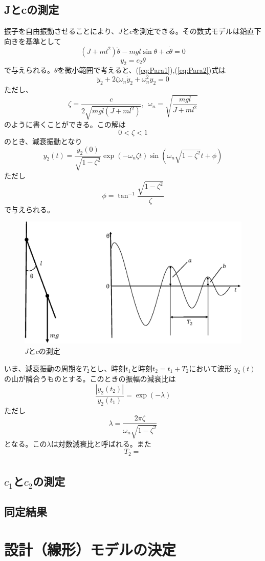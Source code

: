\subsection{Jとcの測定}
	振子を自由振動させることにより、$J$と$c$を測定できる。その数式モデルは鉛直下向きを基準として
	\begin{equation}
		(J + ml^{2})\ddot{\theta} - mgl\sin{\theta} + c\dot{\theta} = 0
		\label{eq:Para1}
	\end{equation}
	\begin{equation}
		y_{2} = c_{2}\theta
	\label{eq:Para2}
	\end{equation}
	で与えられる。$\theta$を微小範囲で考えると、(\ref{eq:Para1}),(\ref{eq:Para2})式は
	\begin{equation}
		\ddot{y}_{2} + 2\zeta\omega_{n}\dot{y}_{2} + \omega_{n}^{2}y_{2} = 0
	\end{equation}
	ただし、
	\begin{equation}
		\zeta = \frac{c}{2\sqrt{mgl\left(J + ml^{2}\right)}} 
		,\ \  \omega_{n} = \sqrt{\frac{mgl}{J+ml^{2}}}
	\end{equation}
	のように書くことができる。この解は
	\[0<\zeta<1\]
	のとき、減衰振動となり
	\[
		y_{2}(t) = \frac{y_{2}(0)}{\sqrt{1-\zeta^{2}}}\exp{(-\omega_{n}\zeta t)}
	  	\sin{(\omega_{n}\sqrt{1-\zeta^{2}}t + \phi)}
	\]
	ただし
	\[
		\phi = \tan^{-1}{\frac{\sqrt{1-\zeta^2}}{\zeta}}
	\]
	で与えられる。
	\begin{figure}[H]
		\centering
		\includegraphics[width=1.0\linewidth]{gazo/ParameterJC.eps}
		\caption{$J$と$c$の測定}
		\label{image:parameterJC}
	\end{figure}
	\par
	いま、減衰振動の周期を$T_{2}$とし、時刻$t_{1}$と時刻$t_{2} = t_{1}+T_{2}$において波形
	$y_{2}(t)$の山が隣合うものとする。このときの振幅の減衰比は
	\[
		\frac{|y_{2}(t_{2})|}{y_{2}(t_{1})} = \exp{(-\lambda)}
	\]
	ただし
	\begin{equation}
		\lambda = \frac{2\pi\zeta}{\omega_{n}\sqrt{1-\zeta^2}}
	\end{equation}
	となる。この$\lambda$は対数減衰比と呼ばれる。また
	\[
		T_{2} = \frac{}{}
	\]
	
\subsection{$c_1$と$c_2$の測定}
\subsection{同定結果}

\section{設計（線形）モデルの決定}